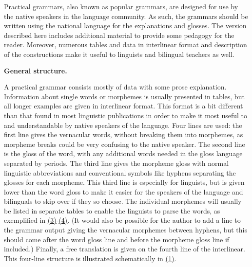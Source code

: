 \documentclass[12pt]{article}
\begin{document}
Practical grammars, also known as popular grammars, are designed for use by the native speakers in the language community. As such, the grammars should be written using the national language for the explanations and glosses. The version described here includes additional material to provide some pedagogy for the reader. Moreover, numerous tables and data in interlinear format and description of the constructions make it useful to linguists and bilingual teachers as well.\par{}\vspace{.25in}\noindent\protect\hypertarget{sPracticalStructure}{{\noindent
\textbf{{ }}}}{\noindent
\textbf{{\protect\noindent
General structure. }}}
A practical grammar consists mostly of data with some prose explanation. Information about single words or morphemes is usually presented in tables, but all longer examples are given in interlinear format. This format is a bit different than that found in most linguistic publications in order to make it most useful to and understandable by native speakers of the language. Four lines are used: the first line gives the vernacular words, without breaking them into morphemes, as morpheme breaks could be very confusing to the native speaker. The second line is the gloss of the word, with any additional words needed in the gloss language separated by periods. The third line gives the morpheme gloss with normal linguistic abbreviations and conventional symbols like hyphens separating the glosses for each morpheme. This third line is especially for linguists, but is given lower than the word gloss to make it easier for the speakers of the language and bilinguals to skip over if they so choose. The individual morphemes will usually be listed in separate tables to enable the linguists to parse the words, as exemplified in \hyperlink{xIZPossPnDep}{(3)}-\hyperlink{xIZInflectionFeatures}{(4)}. (It would also be possible for the author to add a line to the grammar output giving the vernacular morphemes between hyphens, but this should come after the word gloss line and before the morpheme gloss line if included.) Finally, a free translation is given on the fourth line of the interlinear. This four-line structure is illustrated schematically in \hyperlink{xInterlinearEx}{(1)}.\par{}{\vspace{12pt}\raggedright{}}
\end{document}
